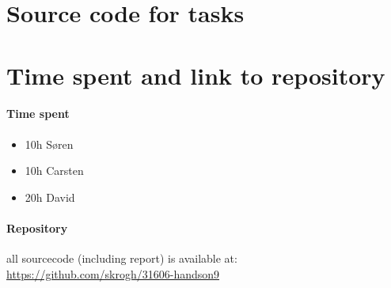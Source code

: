 \section{Source code for tasks}










\section{Time spent and link to repository}

\paragraph{ Time spent }
\begin{itemize}
  \item 10h Søren
  \item 10h Carsten
  \item 20h David
\end{itemize}

\paragraph{ Repository }
all sourcecode (including report) is available at:
\url{ https://github.com/skrogh/31606-handson9 }